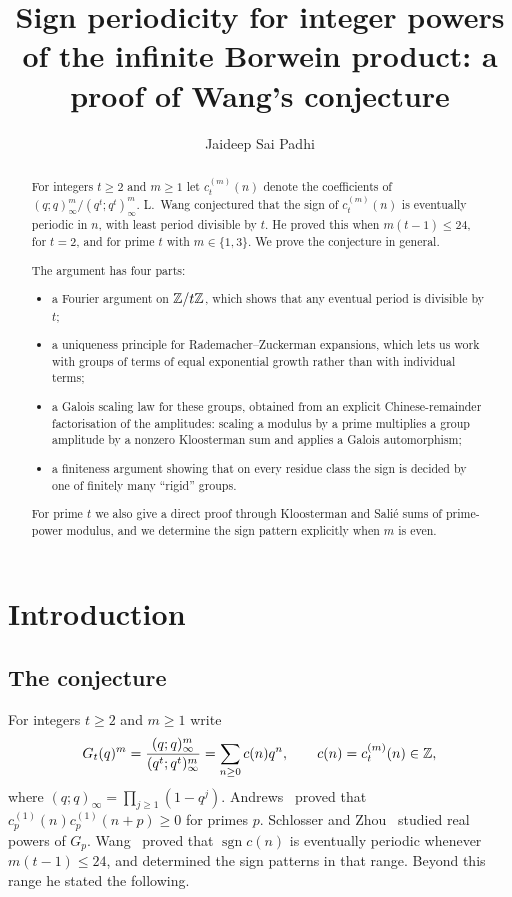 \documentclass[11pt]{amsart}
\title[Sign periodicity for powers of the infinite Borwein product]{Sign periodicity for integer powers of the infinite Borwein product: a proof of Wang's conjecture}
\author{Jaideep Sai Padhi}
\theoremstyle{definition}\newtheorem{definition}[theorem]{Definition}
\theoremstyle{remark}\newtheorem{remark}[theorem]{Remark}
\newcommand{\sgn}{\operatorname{sgn}}\newcommand{\lcm}{\operatorname{lcm}}
\begin{document}
\begin{abstract}
For integers $t\ge2$ and $m\ge1$ let $c_t^{(m)}(n)$ denote the coefficients of $(q;q)_\infty^m/(q^t;q^t)_\infty^m$. L.~Wang conjectured that the sign of $c_t^{(m)}(n)$ is eventually periodic in $n$, with least period divisible by $t$. He proved this when $m(t-1)\le24$, for $t=2$, and for prime $t$ with $m\in\{1,3\}$. We prove the conjecture in general.

The argument has four parts:
\begin{itemize}[leftmargin=1.5em]
\item a Fourier argument on $\mathbb Z/t\mathbb Z$, which shows that any eventual period is divisible by $t$;
\item a uniqueness principle for Rademacher--Zuckerman expansions, which lets us work with groups of terms of equal exponential growth rather than with individual terms;
\item a Galois scaling law for these groups, obtained from an explicit Chinese-remainder factorisation of the amplitudes: scaling a modulus by a prime multiplies a group amplitude by a nonzero Kloosterman sum and applies a Galois automorphism;
\item a finiteness argument showing that on every residue class the sign is decided by one of finitely many ``rigid'' groups.
\end{itemize}
For prime $t$ we also give a direct proof through Kloosterman and Sali\'e sums of prime-power modulus, and we determine the sign pattern explicitly when $m$ is even.
\end{abstract}
\maketitle

\section{Introduction}\label{sec:intro}
\subsection{The conjecture}
For integers $t\ge2$ and $m\ge1$ write
\begin{equation}\label{eq:def}
G_t(q)^m=\frac{(q;q)_\infty^m}{(q^t;q^t)_\infty^m}=\sum_{n\ge0}c(n)q^n,\qquad c(n)=c_t^{(m)}(n)\in\mathbb Z,
\end{equation}
where $(q;q)_\infty=\prod_{j\ge1}(1-q^j)$. Andrews~\cite{A} proved that $c_p^{(1)}(n)c_p^{(1)}(n+p)\ge0$ for primes $p$. Schlosser and Zhou~\cite{SZ} studied real powers of $G_p$. Wang~\cite{W} proved that $\sgn c(n)$ is eventually periodic whenever $m(t-1)\le24$, and determined the sign patterns in that range. Beyond this range he stated the following.
\end{document}
